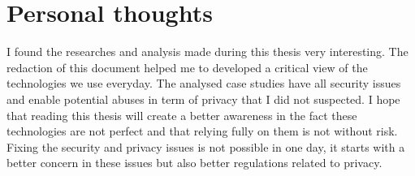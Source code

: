 \section{Personal thoughts}

I found the researches and analysis made during this thesis very interesting.
The redaction of this document helped me to developed a critical view of the technologies we use everyday.
The analysed case studies have all security issues and enable potential abuses in term of privacy that I did not suspected.
I hope that reading this thesis will create a better awareness in the fact these technologies are not perfect and that relying fully on them is not without risk.
Fixing the security and privacy issues is not possible in one day, it starts with a better concern in these issues but also better regulations related to privacy.